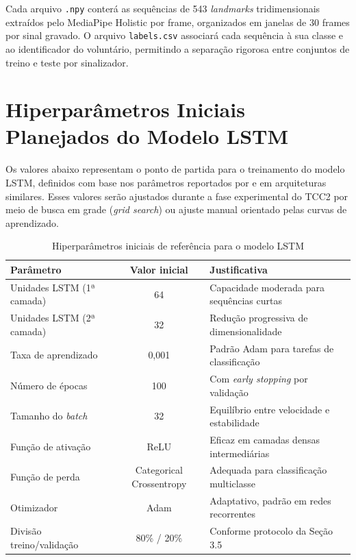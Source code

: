 Cada arquivo \texttt{.npy} conterá as sequências de 543 \textit{landmarks} tridimensionais extraídos pelo MediaPipe Holistic por frame, organizados em janelas de 30 frames por sinal gravado. O arquivo \texttt{labels.csv} associará cada sequência à sua classe e ao identificador do voluntário, permitindo a separação rigorosa entre conjuntos de treino e teste por sinalizador.

\section{Hiperparâmetros Iniciais Planejados do Modelo LSTM}

Os valores abaixo representam o ponto de partida para o treinamento do modelo LSTM, definidos com base nos parâmetros reportados por  e  em arquiteturas similares. Esses valores serão ajustados durante a fase experimental do TCC2 por meio de busca em grade (\textit{grid search}) ou ajuste manual orientado pelas curvas de aprendizado.

\begin{table}[htb]
    \centering
    \caption{Hiperparâmetros iniciais de referência para o modelo LSTM}
    \label{tab:hiperparametros}
    \begin{tabular}{|l|c|l|}
        \hline
        \textbf{Parâmetro} & \textbf{Valor inicial} & \textbf{Justificativa} \\
        \hline
        Unidades LSTM (1ª camada) & 64 & Capacidade moderada para sequências curtas \\
        Unidades LSTM (2ª camada) & 32 & Redução progressiva de dimensionalidade \\
        Taxa de aprendizado & 0,001 & Padrão Adam para tarefas de classificação \\
        Número de épocas & 100 & Com \textit{early stopping} por validação \\
        Tamanho do \textit{batch} & 32 & Equilíbrio entre velocidade e estabilidade \\
        Função de ativação & ReLU & Eficaz em camadas densas intermediárias \\
        Função de perda & Categorical Crossentropy & Adequada para classificação multiclasse \\
        Otimizador & Adam & Adaptativo, padrão em redes recorrentes \\
        Divisão treino/validação & 80\% / 20\% & Conforme protocolo da Seção 3.5 \\
        \hline
    \end{tabular}
\end{table}
